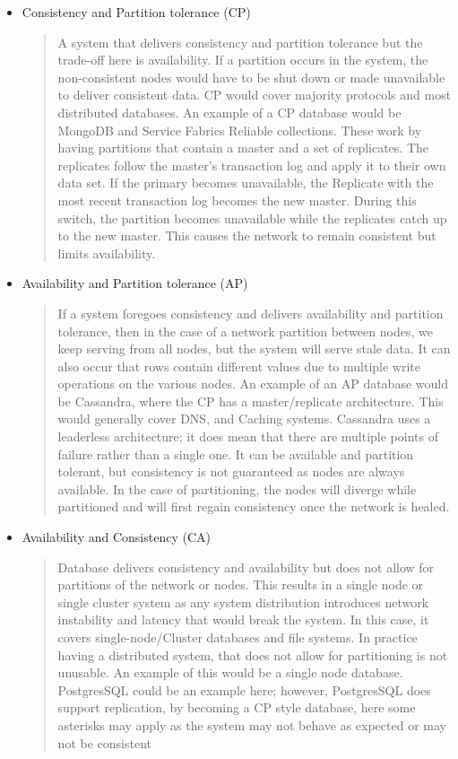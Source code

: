 \documentclass[a4paper,10pt,titlepage]{report}
\begin{document}
\begin{itemize}
    \item Consistency and Partition tolerance (CP) \\ 
    \begin{quote}
         A system that delivers consistency and partition tolerance but the trade-off here is availability. If a partition occurs in the system, the non-consistent nodes would have to be shut down or made unavailable to deliver consistent data. CP would cover majority protocols and most distributed databases. An example of a CP database would be MongoDB and Service Fabrics Reliable collections. These work by having partitions that contain a master and a set of replicates. The replicates follow the master's transaction log and apply it to their own data set. If the primary becomes unavailable, the Replicate with the most recent transaction log becomes the new master. During this switch, the partition becomes unavailable while the replicates catch up to the new master. This causes the network to remain consistent but limits availability.
    \end{quote}


    \item Availability and Partition tolerance (AP) \\ 
    \begin{quote}
    If a system foregoes consistency and delivers availability and partition tolerance, then in the case of a network partition between nodes, we keep serving from all nodes, but the system will serve stale data. It can also occur that rows contain different values due to multiple write operations on the various nodes. An example of an AP database would be Cassandra, where the CP has a master/replicate architecture. This would generally cover DNS, and Caching systems. Cassandra uses a leaderless architecture; it does mean that there are multiple points of failure rather than a single one. It can be available and partition tolerant, but consistency is not guaranteed as nodes are always available. In the case of partitioning, the nodes will diverge while partitioned and will first regain consistency once the network is healed. 
    \end{quote}

    \item Availability and Consistency (CA) \\ 
    \begin{quote}
    Database delivers consistency and availability but does not allow for partitions of the network or nodes. This results in a single node or single cluster system as any system distribution introduces network instability and latency that would break the system. In this case, it covers single-node/Cluster databases and file systems. In practice having a distributed system, that does not allow for partitioning is not unusable. An example of this would be a single node database. PostgresSQL could be an example here; however, PostgresSQL does support replication, by becoming a CP style database, here some asterisks may apply as the system may not behave as expected or may not be consistent\cite{aphyrpostgres}  
    \end{quote}
\end{itemize}
\end{document}
